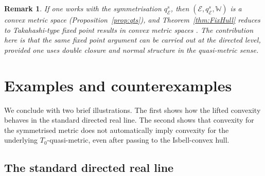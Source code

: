 \documentclass[preprint,12pt]{elsarticle}
\numberwithin{equation}{section}
\newtheorem{remark}[theorem]{Remark}
\newcommand{\E}{\mathcal{E}}
\begin{document}
\begin{remark}\label{rem:FixHull-metric}
If one works with the symmetrisation $q_{\E}^{s}$, then $(\E,q_{\E}^{s},\mathbb{W})$ is a convex
metric space (Proposition~\ref{prop:qts}), and Theorem~\ref{thm:FixHull} reduces to Takahashi-type
fixed point results in convex metric spaces \cite{Takahashi1970}. The contribution here is that the
same fixed point argument can be carried out at the directed level, provided one uses double closure
and normal structure in the quasi-metric sense.
\end{remark}

\section{Examples and counterexamples}\label{sec:examples}

We conclude with two brief illustrations.  The first shows how the lifted
convexity behaves in the standard directed real line.  The second shows that
convexity for the symmetrised metric does not automatically imply convexity
for the underlying \(T_{0}\)-quasi-metric, even after passing to the
Isbell-convex hull.

\subsection{The standard directed real line}
\end{document}
